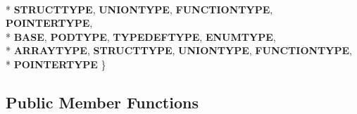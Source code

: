 \begin{DoxyCompactItemize}
\\*
{\bfseries S\-T\-R\-U\-C\-T\-T\-Y\-P\-E}, 
{\bfseries U\-N\-I\-O\-N\-T\-Y\-P\-E}, 
{\bfseries F\-U\-N\-C\-T\-I\-O\-N\-T\-Y\-P\-E}, 
{\bfseries P\-O\-I\-N\-T\-E\-R\-T\-Y\-P\-E}, 
\\*
{\bfseries B\-A\-S\-E}, 
{\bfseries P\-O\-D\-T\-Y\-P\-E}, 
{\bfseries T\-Y\-P\-E\-D\-E\-F\-T\-Y\-P\-E}, 
{\bfseries E\-N\-U\-M\-T\-Y\-P\-E}, 
\\*
{\bfseries A\-R\-R\-A\-Y\-T\-Y\-P\-E}, 
{\bfseries S\-T\-R\-U\-C\-T\-T\-Y\-P\-E}, 
{\bfseries U\-N\-I\-O\-N\-T\-Y\-P\-E}, 
{\bfseries F\-U\-N\-C\-T\-I\-O\-N\-T\-Y\-P\-E}, 
\\*
{\bfseries P\-O\-I\-N\-T\-E\-R\-T\-Y\-P\-E}
 \}
\end{DoxyCompactItemize}
\subsection*{Public Member Functions}
